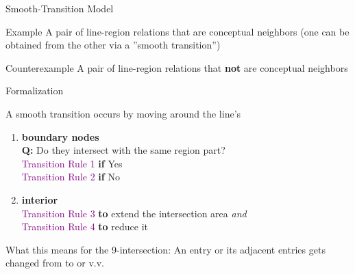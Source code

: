 

	\begin{frame}{Smooth-Transition Model}
		\begin{block}{Example}
			A pair of line-region relations that are conceptual neighbors (one can be obtained from the other via a ''smooth transition'')
		\end{block}
		
		\begin{block}{Counterexample}
			A pair of line-region relations that \textbf{not} are conceptual neighbors
		\end{block}
	\end{frame}

	
	
	\begin{frame}{Formalization}
		\begin{block}{A smooth transition occurs by moving around the line's}
		\begin{enumerate}
			\item \textbf{boundary nodes}\\ \vspace{6pt}
			\textbf{Q:} Do they intersect with the same region part?\\
			\textcolor{purple}{Transition Rule 1} \textbf{if} Yes\\
			\textcolor{purple}{Transition Rule 2} \textbf{if} No
			
			\item \textbf{interior}\\ \vspace{6pt}
			\textcolor{purple}{Transition Rule 3} \textbf{to} extend the intersection area \textit{and}\\
			\textcolor{purple}{Transition Rule 4} \textbf{to} reduce it
		\end{enumerate}
		\end{block}
		
		\begin{block}{What this means for the 9-intersection:}
			 An entry or its adjacent entries gets changed from \Empty{} to \NotEmpty{} or v.v.
		\end{block}
	\end{frame}

	
